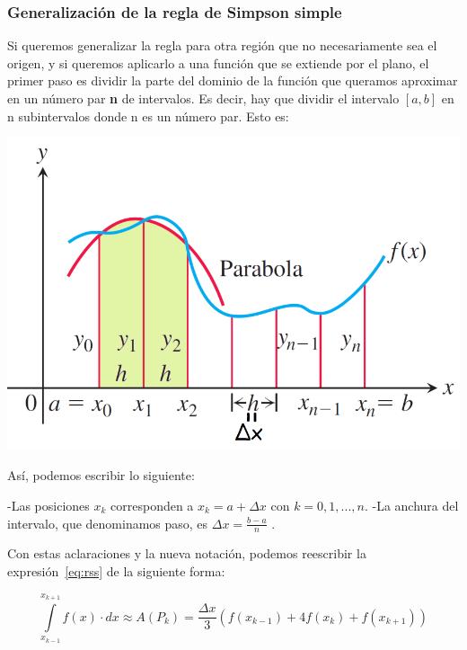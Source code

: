 \documentclass{article}
\begin{document}
		\subsubsection{Generalización de la regla de Simpson simple}
		
		Si queremos generalizar la regla para otra región que no necesariamente sea el origen, y si queremos aplicarlo a una función que se extiende por el plano, el primer paso es dividir la parte del dominio de la función que queramos aproximar en un número par \textbf{n} de intervalos. Es decir, hay que dividir el intervalo $[a,b]$ en n subintervalos donde n es un número par. Esto es:
		
		\begin{center}
			\includegraphics[scale=0.5]{simple_n}
		\end{center}
		
		Así, podemos escribir lo siguiente:
		
		\begin{flushleft}
			-Las posiciones $x_k$ corresponden a $x_k=a+\Delta x$ con $k=0,1,...,n$.\newline
			-La anchura del intervalo, que denominamos paso, es $\Delta x=\frac{b-a}{n}$ .
		\end{flushleft}
		
		Con estas aclaraciones y la nueva notación, podemos reescribir la expresión~\ref{eq:rss} de la siguiente forma:
		
		\begin{equation}
			\int \limits_{x_{k-1}}^{x_{k+1}} f(x) \cdot dx \approx 
			A(P_k) =
			\frac{\Delta x}{3}(f(x_{k-1})+4f(x_k)+f(x_{k+1}))
		\end{equation}
		
\end{document}
